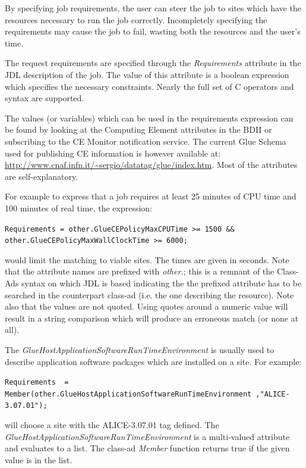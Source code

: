 By specifying job requirements, the user can steer the job to sites which have the resources 
necessary to run the job correctly. Incompletely specifying the requirements may cause the job 
to fail, wasting both the resources and the user's time.

The request requirements are specified through the \emph{Requirements} attribute in the JDL 
description of the job. The value of this attribute is a boolean expression which specifies the 
necessary constraints. Nearly the full set of C operators and syntax are supported.

The values (or variables) which can be used in the requirements expression can be found by looking 
at the Computing Element attributes in the BDII or subscribing to the CE Monitor notification service.
The current Glue Schema used for publishing CE information is however available at:
\url{http://www.cnaf.infn.it/~sergio/datatag/glue/index.htm}. Most of the attributes are 
self-explanatory.

For example to express that a job requires at least 25 minutes of CPU time and 100 minutes of real 
time, the expression:

\smallskip
{\scriptsize{
\verb!Requirements = other.GlueCEPolicyMaxCPUTime >= 1500 && other.GlueCEPolicyMaxWallClockTime >= 6000;!
}}
\smallskip


would limit the matching to viable sites. The times are given in seconds. 
Note that the attribute names are prefixed with \textit{other.}; this is a remnant of the Class-Ads syntax on 
which JDL is based indicating the the prefixed attribute has to be searched in the counterpart class-ad (i.e. the 
one describing the resource). Note also that the values are not quoted. Using quotes around a numeric value 
will result in a string comparison which will produce an erroneous match (or none at all).

The \textit{GlueHostApplicationSoftwareRunTimeEnvironment} is usually used to describe application software 
packages which are installed on a site. For example:

\smallskip
{\scriptsize{
\verb!Requirements  = Member(other.GlueHostApplicationSoftwareRunTimeEnvironment ,"ALICE-3.07.01");!
}}
\smallskip

will choose a site with the ALICE-3.07.01 tag defined. The \textit{GlueHostApplicationSoftwareRunTimeEnvironment} 
is a multi-valued attribute and evaluates to a list. The class-ad \textit{Member} function returns true if the given 
value is in the list.


